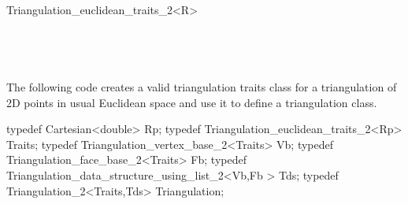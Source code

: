 \begin{ccRefClass}{Triangulation_euclidean_traits_2<R>}
\ccSeeAlso
{} \\
 \\
\\
 \\
 \\

\ccExample
The following code creates a  valid triangulation traits class 
for a triangulation of 2D points in usual Euclidean space
and use it to define a triangulation class.

\begin{cprog}

typedef Cartesian<double> Rp;
typedef Triangulation_euclidean_traits_2<Rp> Traits;
typedef Triangulation_vertex_base_2<Traits> Vb;
typedef Triangulation_face_base_2<Traits> Fb;
typedef Triangulation_data_structure_using_list_2<Vb,Fb > Tds;
typedef Triangulation_2<Traits,Tds> Triangulation;

\end{cprog}


\end{ccRefClass}


